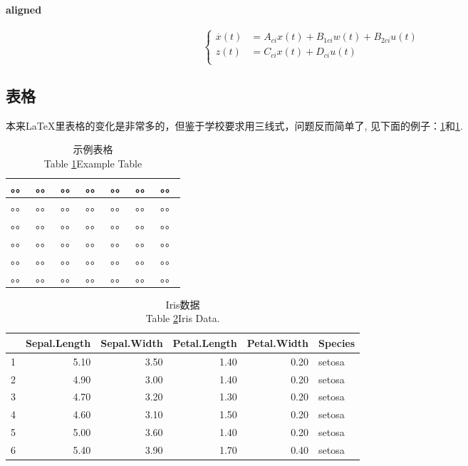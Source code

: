 \paragraph{aligned}
\begin{equation}
\left\{
\begin{aligned}
\overset{.}x(t) &=A_{ci}x(t)+B_{1ci}w(t)+B_{2ci}u(t)  \\
z(t) &=C_{ci}x(t)+D_{ci}u(t) \\
\end{aligned}
\right.
\end{equation}


\subsection{表格}
本来\LaTeX 里表格的变化是非常多的，但鉴于学校要求用三线式，问题反而简单了, 见下面的例子：\cref{tab:1}和\cref{tab:1}. 
\begin{table}[htbp]\center
	\caption{\label{tab:1}示例表格\\Table \ref{tab:1}\quad Example Table}
	\begin{tabular}{lcccccl}
		\toprule
		。。 & 。。 & 。。 & 。。 & 。。& 。。 & 。。\\
		\midrule
		。。 & 。。 & 。。 & 。。 & 。。& 。。 & 。。\\
		。。 & 。。 & 。。 & 。。 & 。。& 。。 & 。。\\
		。。 & 。。 & 。。 & 。。 & 。。& 。。 & 。。\\
		。。 & 。。 & 。。 & 。。 & 。。& 。。 & 。。\\
		。。 & 。。 & 。。 & 。。 & 。。& 。。 & 。。\\
		\bottomrule
	\end{tabular}
\end{table}


\begin{table}[ht]
	\centering
	\caption{\label{tab:2}Iris数据\\Table \ref{tab:2}\quad Iris Data.} 
	\begin{tabular}{rrrrrl}
		\hline
		& Sepal.Length & Sepal.Width & Petal.Length & Petal.Width & Species \\ 
		\hline
		1 & 5.10 & 3.50 & 1.40 & 0.20 & setosa \\ 
		2 & 4.90 & 3.00 & 1.40 & 0.20 & setosa \\ 
		3 & 4.70 & 3.20 & 1.30 & 0.20 & setosa \\ 
		4 & 4.60 & 3.10 & 1.50 & 0.20 & setosa \\ 
		5 & 5.00 & 3.60 & 1.40 & 0.20 & setosa \\ 
		6 & 5.40 & 3.90 & 1.70 & 0.40 & setosa \\ 
		\hline
	\end{tabular}
\end{table}


